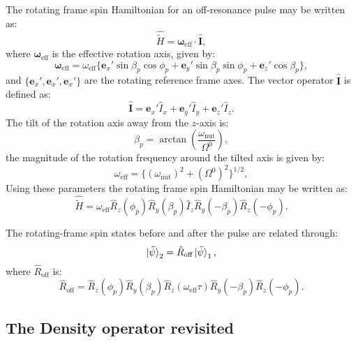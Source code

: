 The rotating frame spin Hamiltonian for an off-resonance pulse may be written as:
\begin{equation}
  \hat{\tilde{H}} = \pmb{\omega}_\text{eff}\cdot\hat{\mathbf{I}},
\end{equation}
where $\pmb{\omega}_{\text{eff}}$ is the effective rotation axis, given by:
\begin{equation}
  \pmb{\omega}_{\text{eff}} = \omega_{\text{eff}}\{\mathbf{e}_x'\sin\beta_p\cos\phi_p + \mathbf{e}_y'\sin\beta_p\sin\phi_p + \mathbf{e}_z'\cos\beta_p\},
\end{equation}
and $\{\mathbf{e}_x',\mathbf{e}_x',\mathbf{e}_x'\}$ are the rotating reference frame axes. The vector operator
$\hat{\mathbf{I}}$ is defined as:
\begin{equation}
  \hat{\mathbf{I}} = \mathbf{e}_x'\hat{I}_x + \mathbf{e}_y'\hat{I}_y + \mathbf{e}_z'\hat{I}_z.
\end{equation}
The tilt of the rotation axis away from the $z$-axis is:
\begin{equation}
  \beta_p = \arctan(\frac{\omega_{\text{nut}}}{\Omega^0}),
\end{equation}
the magnitude of the rotation frequency around the tilted axis is given by:
\begin{equation}
  \omega_{\text{eff}} = \{(\omega_{\text{nut}})^2 + (\Omega^0)^2\}^{1/2},
\end{equation}
Using these parameters the rotating frame spin Hamiltonian may be written as:
\begin{equation}
  \hat{\tilde{H}} = \omega_{\text{eff}}\hat{R}_z(\phi_p)\hat{R}_y(\beta_p)\hat{I}_z\hat{R}_y(-\beta_p)\hat{R}_z(-\phi_p).
\end{equation}

The rotating-frame spin states before and after the pulse are related through:
\begin{equation}
  \ket{\tilde{\psi}}_2 = \hat{R}_{\text{off}}\ket{\tilde{\psi}}_1,
\end{equation}
where $\hat{R}_{\text{off}}$ is:
\begin{equation}
  \hat{R}_{\text{off}} = \hat{R}_z(\phi_p)\hat{R}_y(\beta_p)\hat{R}_z(\omega_{\text{eff}}\tau)\hat{R}_y(-\beta_p)\hat{R}_z(-\phi_p).
\end{equation}

\subsection{The Density operator revisited}

